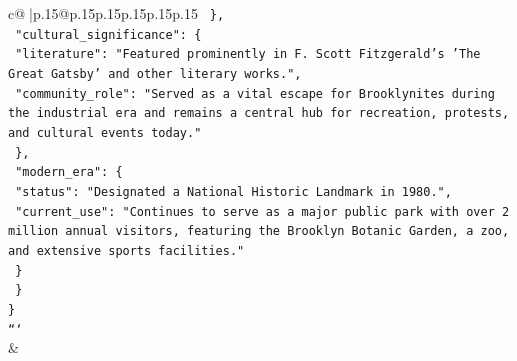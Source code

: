 \documentclass{article}
\begin{document}
{\begin{supertabular}{c@{$\;$}|p{.15\linewidth}@{}p{.15\linewidth}p{.15\linewidth}p{.15\linewidth}p{.15\linewidth}p{.15\linewidth}}
{{{\texttt{    \},} \\
\texttt{    "cultural\_significance": \{} \\
\texttt{      "literature": "Featured prominently in F. Scott Fitzgerald's 'The Great Gatsby' and other literary works.",} \\
\texttt{      "community\_role": "Served as a vital escape for Brooklynites during the industrial era and remains a central hub for recreation, protests, and cultural events today."} \\
\texttt{    \},} \\
\texttt{    "modern\_era": \{} \\
\texttt{      "status": "Designated a National Historic Landmark in 1980.",} \\
\texttt{      "current\_use": "Continues to serve as a major public park with over 2 million annual visitors, featuring the Brooklyn Botanic Garden, a zoo, and extensive sports facilities."} \\
\texttt{    \}} \\
\texttt{  \}} \\
\texttt{\}} \\
\texttt{```} \\
            }
        }
    }
    & \\ \\


\end{supertabular}}
\end{document}

